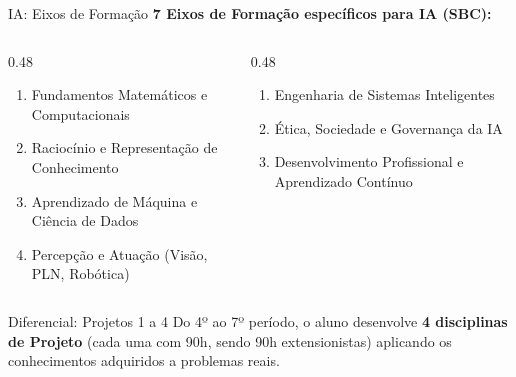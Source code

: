 \documentclass[aspectratio=169]{beamer}
\begin{document}
\begin{frame}{IA: Eixos de Formação}
  \textbf{7 Eixos de Formação específicos para IA (SBC):}
  \begin{columns}[T]
    \begin{column}{0.48\textwidth}
      \begin{enumerate}\setlength\itemsep{3pt}
        \item Fundamentos Matemáticos e Computacionais
        \item Raciocínio e Representação de Conhecimento
        \item Aprendizado de Máquina e Ciência de Dados
        \item Percepção e Atuação (Visão, PLN, Robótica)
      \end{enumerate}
    \end{column}
    \begin{column}{0.48\textwidth}
      \begin{enumerate}\setlength\itemsep{3pt}
        \setcounter{enumi}{4}
        \item Engenharia de Sistemas Inteligentes
        \item Ética, Sociedade e Governança da IA
        \item Desenvolvimento Profissional e Aprendizado Contínuo
      \end{enumerate}
    \end{column}
  \end{columns}
  \pause
  \vspace{0.3cm}
  \begin{alertblock}{Diferencial: Projetos 1 a 4}
    Do 4º ao 7º período, o aluno desenvolve \textbf{4 disciplinas de Projeto} (cada uma com 90h, sendo 90h extensionistas) aplicando os conhecimentos adquiridos a problemas reais.
  \end{alertblock}
\end{frame}
\end{document}
